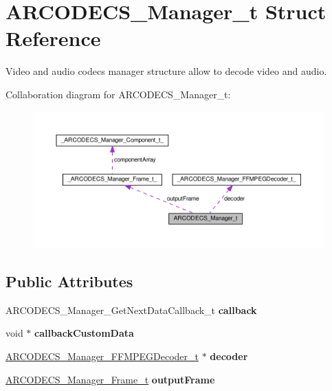 \hypertarget{structARCODECS__Manager__t}{}\section{A\+R\+C\+O\+D\+E\+C\+S\+\_\+\+Manager\+\_\+t Struct Reference}
\label{structARCODECS__Manager__t}


Video and audio codecs manager structure allow to decode video and audio.  




Collaboration diagram for A\+R\+C\+O\+D\+E\+C\+S\+\_\+\+Manager\+\_\+t\+:
\nopagebreak
\begin{figure}[H]
\begin{center}
\leavevmode
\includegraphics[width=350pt]{structARCODECS__Manager__t__coll__graph}
\end{center}
\end{figure}
\subsection*{Public Attributes}
\begin{DoxyCompactItemize}
\item 
\hypertarget{structARCODECS__Manager__t_a2dce3f7515b7473133d402162399bfa8}{}A\+R\+C\+O\+D\+E\+C\+S\+\_\+\+Manager\+\_\+\+Get\+Next\+Data\+Callback\+\_\+t {\bfseries callback}\label{structARCODECS__Manager__t_a2dce3f7515b7473133d402162399bfa8}

\item 
\hypertarget{structARCODECS__Manager__t_aaccf39b085a379cd2493a3731c6c3c3a}{}void $\ast$ {\bfseries callback\+Custom\+Data}\label{structARCODECS__Manager__t_aaccf39b085a379cd2493a3731c6c3c3a}

\item 
\hypertarget{structARCODECS__Manager__t_a7246195626a8fac847a5d836c8942c4b}{}\hyperlink{struct__ARCODECS__Manager__FFMPEGDecoder__t__}{A\+R\+C\+O\+D\+E\+C\+S\+\_\+\+Manager\+\_\+\+F\+F\+M\+P\+E\+G\+Decoder\+\_\+t} $\ast$ {\bfseries decoder}\label{structARCODECS__Manager__t_a7246195626a8fac847a5d836c8942c4b}

\item 
\hypertarget{structARCODECS__Manager__t_a318ac83874092f41424a5e6a7774dc50}{}\hyperlink{struct__ARCODECS__Manager__Frame__t__}{A\+R\+C\+O\+D\+E\+C\+S\+\_\+\+Manager\+\_\+\+Frame\+\_\+t} {\bfseries output\+Frame}\label{structARCODECS__Manager__t_a318ac83874092f41424a5e6a7774dc50}

\end{DoxyCompactItemize}


